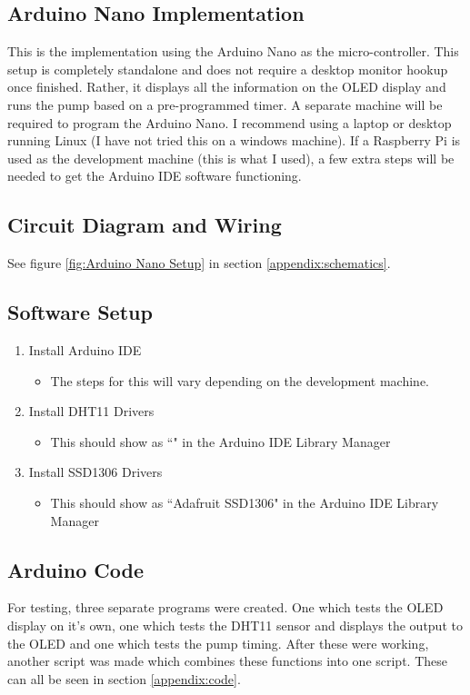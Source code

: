 \documentclass{article}
\begin{document}
\begin{multicols}{2}
		\section{Arduino Nano Implementation}
		This is the implementation using the Arduino Nano as the micro-controller. This setup is completely standalone and does not require a desktop monitor hookup once finished. Rather, it displays all the information on the OLED display and runs the pump based on a pre-programmed timer. A separate machine will be required to program the Arduino Nano. I recommend using a laptop or desktop running Linux (I have not tried this on a windows machine). If a Raspberry Pi is used as the development machine (this is what I used), a few extra steps will be needed to get the Arduino IDE software functioning. 
		
		\subsection{Circuit Diagram and Wiring}
		See figure \ref{fig:Arduino Nano Setup} in section \ref{appendix:schematics}.
		
		\subsection{Software Setup}
		\begin{enumerate}
			\item Install Arduino IDE
			\begin{itemize}
				\item The steps for this will vary depending on the development machine.
			\end{itemize}
			\item Install DHT11 Drivers
			\begin{itemize}
				\item This should show as ``" in the Arduino IDE Library Manager
			\end{itemize}
			\item Install SSD1306 Drivers
			\begin{itemize}
				\item This should show as ``Adafruit SSD1306" in the Arduino IDE Library Manager
			\end{itemize}
		\end{enumerate}
		
		\subsection{Arduino Code}
		For testing, three separate programs were created. One which tests the OLED display on it's own, one which tests the DHT11 sensor and displays the output to the OLED and one which tests the pump timing. After these were working, another script was made which combines these functions into one script. These can all be seen in section \ref{appendix:code}.
		

\end{multicols}
\end{document}
